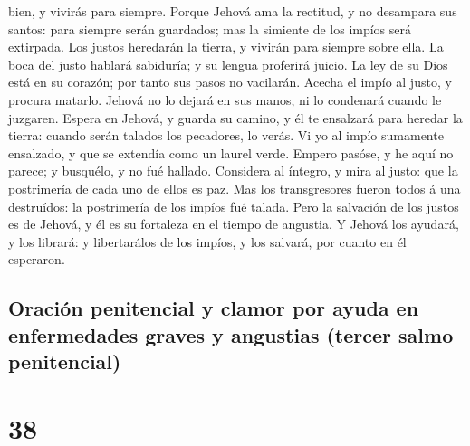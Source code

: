 bien, y vivirás para siempre.  Porque Jehová ama la
rectitud, y no desampara sus santos: para siempre serán guardados; mas
la simiente de los impíos será extirpada.  Los justos
heredarán la tierra, y vivirán para siempre sobre ella. 
La boca del justo hablará sabiduría; y su lengua proferirá juicio.
 La ley de su Dios está en su corazón; por tanto sus
pasos no vacilarán.  Acecha el impío al justo, y procura
matarlo.  Jehová no lo dejará en sus manos, ni lo
condenará cuando le juzgaren.  Espera en Jehová, y guarda
su camino, y él te ensalzará para heredar la tierra: cuando serán
talados los pecadores, lo verás.  Vi yo al impío
sumamente ensalzado, y que se extendía como un laurel verde.
 Empero pasóse, y he aquí no parece; y busquélo, y no fué
hallado.  Considera al íntegro, y mira al justo: que la
postrimería de cada uno de ellos es paz.  Mas los
transgresores fueron todos á una destruídos: la postrimería de los
impíos fué talada.  Pero la salvación de los justos es de
Jehová, y él es su fortaleza en el tiempo de angustia.  Y
Jehová los ayudará, y los librará: y libertarálos de los impíos, y los
salvará, por cuanto en él esperaron.

\hypertarget{oraciuxf3n-penitencial-y-clamor-por-ayuda-en-enfermedades-graves-y-angustias-tercer-salmo-penitencial}{%
\subsection{Oración penitencial y clamor por ayuda en enfermedades
graves y angustias (tercer salmo
penitencial)}\label{oraciuxf3n-penitencial-y-clamor-por-ayuda-en-enfermedades-graves-y-angustias-tercer-salmo-penitencial}}

\hypertarget{section-37}{%
\section{38}\label{section-37}}


